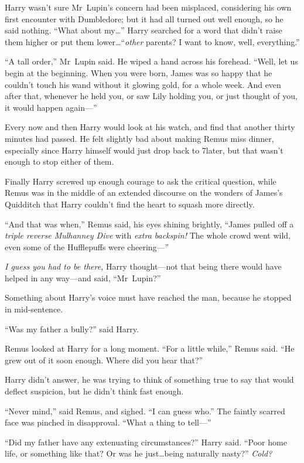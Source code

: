 Harry wasn’t sure Mr~Lupin’s concern had been misplaced, considering his own first encounter with Dumbledore; but it had all turned out well enough, so he said nothing. “What about my…” Harry searched for a word that didn’t raise them higher or put them lower…“\emph{other} parents? I want to know, well, everything.”

“A tall order,” Mr~Lupin said. He wiped a hand across his forehead. “Well, let us begin at the beginning. When you were born, James was so happy that he couldn’t touch his wand without it glowing gold, for a whole week. And even after that, whenever he held you, or saw Lily holding you, or just thought of you, it would happen again—”

\later

Every now and then Harry would look at his watch, and find that another thirty minutes had passed. He felt slightly bad about making Remus miss dinner, especially since Harry himself would just drop back to 7\pm later, but that wasn’t enough to stop either of them.

Finally Harry screwed up enough courage to ask the critical question, while Remus was in the middle of an extended discourse on the wonders of James’s Quidditch that Harry couldn’t find the heart to squash more directly.

“And that was when,” Remus said, his eyes shining brightly, “James pulled off a \emph{triple reverse Mulhanney Dive} with \emph{extra backspin!} The whole crowd went wild, even some of the Hufflepuffs were cheering—”

\emph{I guess you had to be there,} Harry thought—not that being there would have helped in any way—and said, “Mr~Lupin?”

Something about Harry’s voice must have reached the man, because he stopped in mid-sentence.

“Was my father a bully?” said Harry.

Remus looked at Harry for a long moment. “For a little while,” Remus said. “He grew out of it soon enough. Where did you hear that?”

Harry didn’t answer, he was trying to think of something true to say that would deflect suspicion, but he didn’t think fast enough.

“Never mind,” said Remus, and sighed. “I can guess who.” The faintly scarred face was pinched in disapproval. “What a thing to tell—”

“Did my father have any extenuating circumstances?” Harry said. “Poor home life, or something like that? Or was he just…being naturally nasty?” \emph{Cold?}

